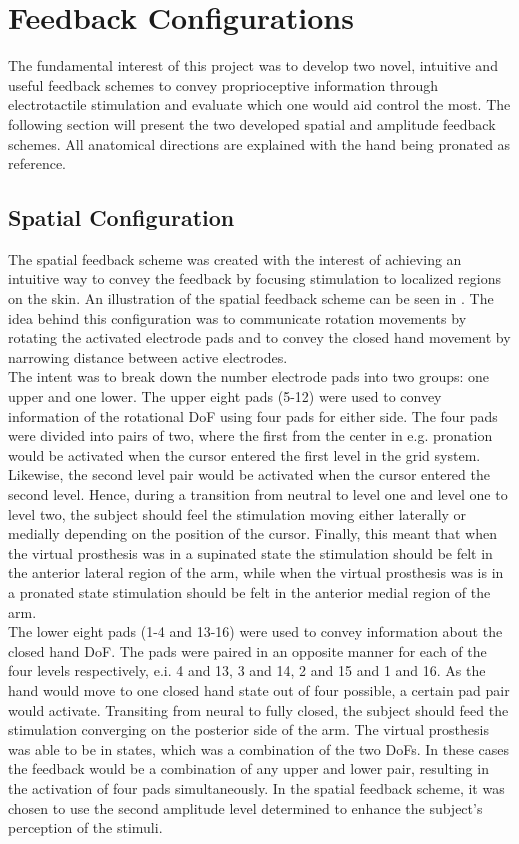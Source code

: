 \section{Feedback Configurations} \label{sec:feed}

The fundamental interest of this project was to develop two novel, intuitive and useful feedback schemes to convey proprioceptive information through electrotactile stimulation and evaluate which one would aid control the most. The following section will present the two developed spatial and amplitude feedback schemes. All anatomical directions are explained with the hand being pronated as reference.      

\subsection{Spatial Configuration}

The spatial feedback scheme was created with the interest of achieving an intuitive way to convey the feedback by focusing stimulation to localized regions on the skin. An illustration of the spatial feedback scheme can be seen in . The idea behind this configuration was to communicate rotation movements by rotating the activated electrode pads and to convey the closed hand movement by narrowing distance between active electrodes. \\
The intent was to break down the number electrode pads into two groups: one upper and one lower. The upper eight pads (5-12) were used to convey information of the rotational DoF using four pads for either side.  The four pads were divided into pairs of two, where the first from the center in e.g. pronation would be activated when the cursor entered the first level in the grid system. Likewise, the second level pair would be activated when the cursor entered the second level. Hence, during a transition from neutral to level one and level one to level two, the subject should feel the stimulation moving either laterally or medially depending on the position of the cursor. Finally, this meant that when the virtual prosthesis was in a supinated state the stimulation should be felt in the anterior lateral region of the arm, while when the virtual prosthesis was is in a pronated state stimulation should be felt in the anterior medial region of the arm.   \\
The lower eight pads (1-4 and 13-16) were used to convey information about the closed hand DoF. The pads were paired in an opposite manner for each of the four levels respectively, e.i. 4 and 13, 3 and 14, 2 and 15 and 1 and 16. As the hand would move to one closed hand state out of four possible, a certain pad pair would activate. Transiting from neural to fully closed, the subject should feed the stimulation converging on the posterior side of the arm. The virtual prosthesis was able to be in states, which was a combination of the two DoFs. In these cases the feedback would be a combination of any upper and lower pair, resulting in the activation of four pads simultaneously. In the spatial feedback scheme, it was chosen to use the second amplitude level determined to enhance the subject's perception of the stimuli. 

